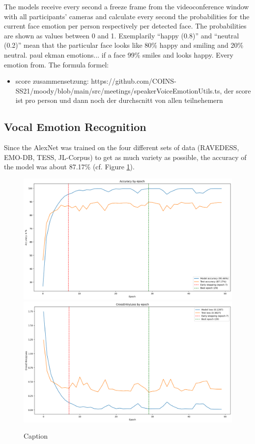 The models receive every second a freeze frame from the videoconference window with all participants’ cameras and calculate every second the probabilities for the current face emotion per person respectively per detected face. The probabilities are shown as values between 0 and 1. Exemplarily ``happy (0.8)'' and ``neutral (0.2)'' mean that the particular face looks like 80\% happy and smiling and 20\% neutral. paul ekman emotions...
 if a face 99\% smiles and looks happy. Every emotion from. The formula 
formel:
\begin{itemize}
\item score zusammensetzung: https://github.com/COINS-SS21/moody/blob/main/src/meetings/speakerVoiceEmotionUtils.ts, der score ist pro person und dann noch der durchscnitt von allen teilnehemern
\end{itemize}

\subsection{Vocal Emotion Recognition}
\label{subsec:results_vocal_emotion_recognition}
Since the AlexNet was trained on the four different sets of data (RAVEDESS, EMO-DB, TESS, JL-Corpus) to get as much variety as possible, the accuracy of the model was about 87.17\% (cf. Figure \ref{fig:alexnet_loss_accuracy}).

\begin{figure}
\centering
\includegraphics[width=1\textwidth]{assets/alexnet_accuracy.png}
\includegraphics[width=1\textwidth]{assets/alexnet_loss.png}
\caption{Caption}
\label{fig:alexnet_loss_accuracy}
\end{figure}

